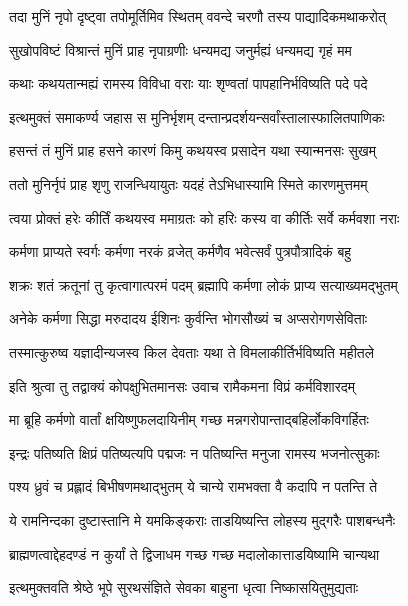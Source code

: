 \twolineshloka
{तदा मुनिं नृपो दृष्ट्वा तपोमूर्तिमिव स्थितम्}
{ववन्दे चरणौ तस्य पाद्यादिकमथाकरोत्}%

\twolineshloka
{सुखोपविष्टं विश्रान्तं मुनिं प्राह नृपाग्रणीः}
{धन्यमद्य जनुर्मह्यं धन्यमद्य गृहं मम}%

\twolineshloka
{कथाः कथयतान्मह्यं रामस्य विविधा वराः}
{याः शृण्वतां पापहानिर्भविष्यति पदे पदे}%

\twolineshloka
{इत्थमुक्तं समाकर्ण्य जहास स मुनिर्भृशम्}
{दन्तान्प्रदर्शयन्सर्वांस्तालास्फालितपाणिकः}%

\twolineshloka
{हसन्तं तं मुनिं प्राह हसने कारणं किमु}
{कथयस्व प्रसादेन यथा स्यान्मनसः सुखम्}%

\twolineshloka
{ततो मुनिर्नृपं प्राह शृणु राजन्धियायुतः}
{यदहं तेऽभिधास्यामि स्मिते कारणमुत्तमम्}%

\twolineshloka
{त्वया प्रोक्तं हरेः कीर्तिं कथयस्व ममाग्रतः}
{को हरिः कस्य वा कीर्तिः सर्वे कर्मवशा नराः}%

\twolineshloka
{कर्मणा प्राप्यते स्वर्गः कर्मणा नरकं व्रजेत्}
{कर्मणैव भवेत्सर्वं पुत्रपौत्रादिकं बहु}%

\twolineshloka
{शक्रः शतं क्रतूनां तु कृत्वागात्परमं पदम्}
{ब्रह्मापि कर्मणा लोकं प्राप्य सत्याख्यमद्भुतम्}%

\twolineshloka
{अनेके कर्मणा सिद्धा मरुदादय ईशिनः}
{कुर्वन्ति भोगसौख्यं च अप्सरोगणसेविताः}%

\twolineshloka
{तस्मात्कुरुष्व यज्ञादीन्यजस्व किल देवताः}
{यथा ते विमलाकीर्तिर्भविष्यति महीतले}%

\twolineshloka
{इति श्रुत्वा तु तद्वाक्यं कोपक्षुभितमानसः}
{उवाच रामैकमना विप्रं कर्मविशारदम्}%

\twolineshloka
{मा ब्रूहि कर्मणो वार्तां क्षयिष्णुफलदायिनीम्}
{गच्छ मन्नगरोपान्ताद्बहिर्लोकविगर्हितः}%

\twolineshloka
{इन्द्रः पतिष्यति क्षिप्रं पतिष्यत्यपि पद्मजः}
{न पतिष्यन्ति मनुजा रामस्य भजनोत्सुकाः}%

\twolineshloka
{पश्य ध्रुवं च प्रह्लादं बिभीषणमथाद्भुतम्}
{ये चान्ये रामभक्ता वै कदापि न पतन्ति ते}%

\twolineshloka
{ये रामनिन्दका दुष्टास्तानि मे यमकिङ्कराः}
{ताडयिष्यन्ति लोहस्य मुद्गरैः पाशबन्धनैः}%

\twolineshloka
{ब्राह्मणत्वाद्देहदण्डं न कुर्यां ते द्विजाधम}
{गच्छ गच्छ मदालोकात्ताडयिष्यामि चान्यथा}%

\twolineshloka
{इत्थमुक्तवति श्रेष्ठे भूपे सुरथसंज्ञिते}
{सेवका बाहुना धृत्वा निष्कासयितुमुद्यताः}%

